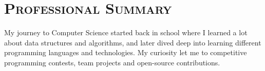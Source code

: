 \vspace*{-3em}
\section{\textsc{Professional Summary}}


My journey to Computer Science started back in school where I learned a lot about data structures and algorithms, and later dived deep into learning different programming languages and technologies. My curiosity let me to competitive programming contests, team projects and open-source contributions.
